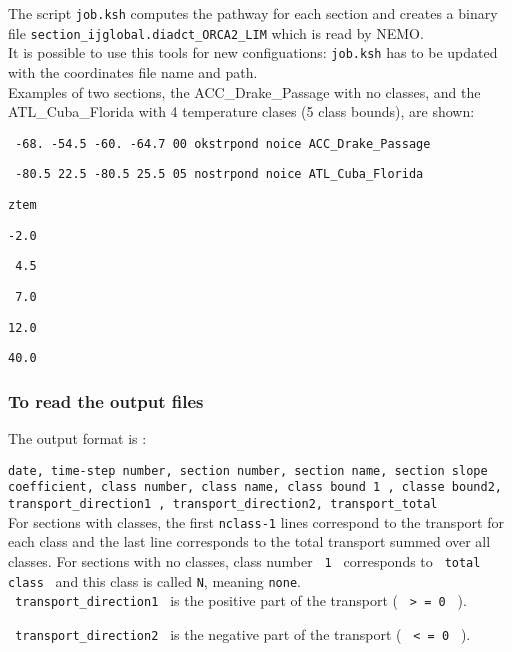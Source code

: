 \documentclass[NEMO_book]{subfiles}
\begin{document}
  
The script \texttt{job.ksh} computes the pathway for each section and creates a binary file 
\texttt{section\_ijglobal.diadct\_ORCA2\_LIM} which is read by NEMO. \\

It is possible to use this tools for new configuations: \texttt{job.ksh} has to be updated 
with the coordinates file name and path. \\


Examples of two sections, the ACC\_Drake\_Passage with no classes, and the
 ATL\_Cuba\_Florida with 4 temperature clases (5 class bounds), are shown:

\noindent \texttt{ -68.    -54.5   -60.    -64.7  00 okstrpond noice ACC\_Drake\_Passage}

\noindent \texttt{ -80.5    22.5   -80.5    25.5  05 nostrpond noice ATL\_Cuba\_Florida}

\noindent \texttt{ztem}

\noindent \texttt{-2.0}

\noindent \texttt{ 4.5}

\noindent \texttt{ 7.0}

\noindent \texttt{12.0}

\noindent \texttt{40.0}


\subsubsection{ To read the output files }

The output format is :
 
{\small\texttt{date, time-step number, section number, section name, section slope coefficient, class number, 
class name, class bound 1 , classe bound2, transport\_direction1 ,  transport\_direction2, transport\_total}}\\


For sections with classes, the first \texttt{nclass-1} lines correspond to the transport for each class 
and the last line corresponds to the total transport summed over all classes. For sections with no classes, class number
\texttt{ 1 } corresponds to \texttt{ total class } and this class is called  \texttt{N}, meaning \texttt{none}.\\


\noindent \texttt{ transport\_direction1 } is the positive part of the transport ( \texttt{ > = 0 } ).

\noindent \texttt{ transport\_direction2 } is the negative part of the transport ( \texttt{ < = 0 } ).\\
\end{document}
